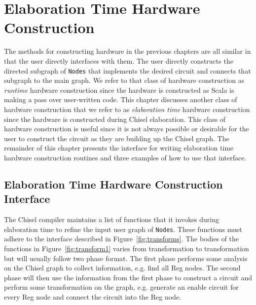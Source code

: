\section{Elaboration Time Hardware Construction}
\label{sec:elab}
The methods for constructing hardware in the previous chapters are all
similar in that the user directly interfaces with them. The user
directly constructs the directed subgraph of {\tt Nodes} that
implements the desired circuit and connects that subgraph to the main
graph. We refer to that class of hardware construction as 
{\it runtime} hardware construction since the hardware is
constructed as Scala is making a pass over user-written code. This
chapter discusses another class of hardware construction that we refer
to as {\it elaboration time} hardware construction since the
hardware is constructed during Chisel elaboration. This class of
hardware construction is useful since it is not always possible or
desirable for the user to construct the circuit as they are building
up the Chisel graph. The remainder of this chapter presents the
interface for writing elaboration time hardware construction routines
and three examples of how to use that interface.

\subsection{Elaboration Time Hardware Construction Interface}
The Chisel compiler maintains a list of functions that it invokes
during elaboration time to refine the input user graph of 
{\tt Nodes}. These functions must adhere to the interface described in
Figure~\ref{fig:transforms}. The bodies of the functions in
Figure~\ref{fig:transform1} varies from transformation to
transformation but will usually follow two phase format. The first
phase performs some analysis on the Chisel graph to collect
information, e.g. find all Reg nodes. The second phase will then use
the information from the first phase to construct a circuit and
perform some transformation on the graph, e.g. generate an enable
circuit for every Reg node and connect the circuit into the Reg node.

